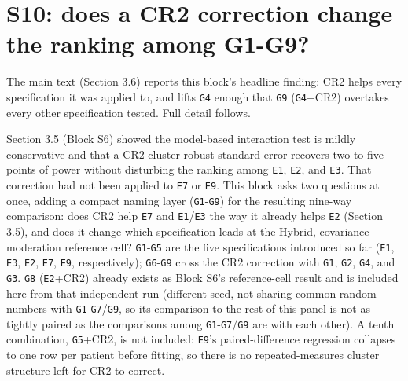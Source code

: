 \documentclass[
  11pt,
]{article}
\begin{document}
\section{S10: does a CR2 correction change the ranking among G1-G9?}\label{s10-does-a-cr2-correction-change-the-ranking-among-g1-g9}

The main text (Section 3.6) reports this block's headline finding:
CR2 helps every specification it was applied to, and lifts \texttt{G4}
enough that \texttt{G9} (\texttt{G4}+CR2) overtakes every other specification
tested. Full detail follows.

Section 3.5 (Block S6) showed the model-based interaction test is
mildly conservative and that a CR2 cluster-robust standard error
recovers two to five points of power without disturbing the ranking
among \texttt{E1}, \texttt{E2}, and \texttt{E3}. That correction had not been applied to
\texttt{E7} or \texttt{E9}. This block asks two questions at once, adding a compact
naming layer (\texttt{G1}-\texttt{G9}) for the resulting nine-way comparison: does
CR2 help \texttt{E7} and \texttt{E1}/\texttt{E3} the way it already helps \texttt{E2}
(Section 3.5), and does it change which specification leads at the
Hybrid, covariance-moderation reference cell? \texttt{G1}-\texttt{G5} are the five
specifications introduced so far (\texttt{E1}, \texttt{E3}, \texttt{E2}, \texttt{E7}, \texttt{E9},
respectively); \texttt{G6}-\texttt{G9} cross the CR2 correction with \texttt{G1}, \texttt{G2},
\texttt{G4}, and \texttt{G3}. \texttt{G8} (\texttt{E2}+CR2) already exists as Block S6's
reference-cell result and is included here from that independent run
(different seed, not sharing common random numbers with \texttt{G1}-\texttt{G7}/\texttt{G9},
so its comparison to the rest of this panel is not as tightly paired
as the comparisons among \texttt{G1}-\texttt{G7}/\texttt{G9} are with each other). A tenth
combination, \texttt{G5}+CR2, is not included: \texttt{E9}'s paired-difference
regression collapses to one row per patient before fitting, so there
is no repeated-measures cluster structure left for CR2 to correct.
\end{document}
